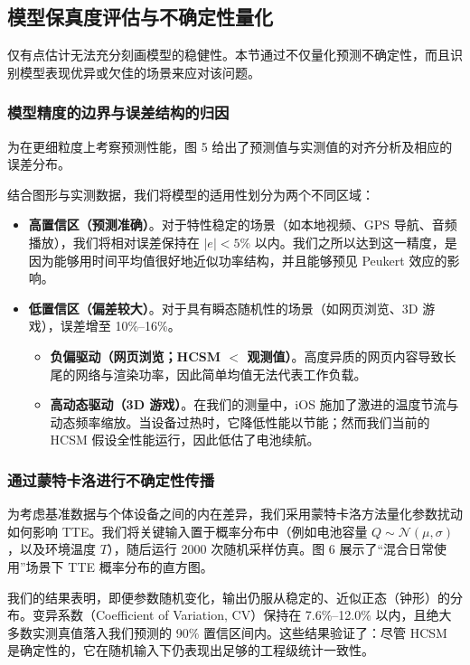 \documentclass[11pt,a4paper]{ctexart}
\begin{document}
\subsection{模型保真度评估与不确定性量化}

仅有点估计无法充分刻画模型的稳健性。本节通过不仅量化预测不确定性，而且识别模型表现优异或欠佳的场景来应对该问题。

\subsubsection{模型精度的边界与误差结构的归因}

为在更细粒度上考察预测性能，图 5 给出了预测值与实测值的对齐分析及相应的误差分布。

结合图形与实测数据，我们将模型的适用性划分为两个不同区域：

\begin{itemize}[leftmargin=2em]
\item \textbf{高置信区（预测准确）}。对于特性稳定的场景（如本地视频、GPS 导航、音频播放），我们将相对误差保持在 $|e|<5\%$ 以内。我们之所以达到这一精度，是因为能够用时间平均值很好地近似功率结构，并且能够预见 Peukert 效应的影响。
\item \textbf{低置信区（偏差较大）}。对于具有瞬态随机性的场景（如网页浏览、3D 游戏），误差增至 10\%–16\%。
  \begin{itemize}[leftmargin=1.6em,label=--]
  \item \textbf{负偏驱动（网页浏览；HCSM $<$ 观测值）}。高度异质的网页内容导致长尾的网络与渲染功率，因此简单均值无法代表工作负载。
  \item \textbf{高动态驱动（3D 游戏）}。在我们的测量中，iOS 施加了激进的温度节流与动态频率缩放。当设备过热时，它降低性能以节能；然而我们当前的 HCSM 假设全性能运行，因此低估了电池续航。
  \end{itemize}
\end{itemize}

\subsubsection{通过蒙特卡洛进行不确定性传播}

为考虑基准数据与个体设备之间的内在差异，我们采用蒙特卡洛方法量化参数扰动如何影响 TTE。我们将关键输入置于概率分布中（例如电池容量 $Q\sim\mathcal{N}(\mu,\sigma)$，以及环境温度 $T$），随后运行 2000 次随机采样仿真。图 6 展示了“混合日常使用”场景下 TTE 概率分布的直方图。

我们的结果表明，即便参数随机变化，输出仍服从稳定的、近似正态（钟形）的分布。变异系数（Coefficient of Variation, CV）保持在 7.6\%–12.0\% 以内，且绝大多数实测真值落入我们预测的 90\% 置信区间内。这些结果验证了：尽管 HCSM 是确定性的，它在随机输入下仍表现出足够的工程级统计一致性。
\end{document}
